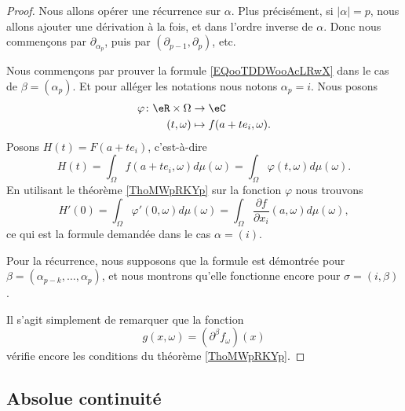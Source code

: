 \begin{proof}
	Nous allons opérer une récurrence sur \( \alpha\). Plus précisément, si \( | \alpha |=p\), nous allons ajouter une dérivation à la fois, et dans l'ordre inverse de \( \alpha\). Donc nous commençons par \( \partial_{\alpha_p}\), puis par \( (\partial_{p-1}, \partial_p)\), etc.

	Nous commençons par prouver la formule \eqref{EQooTDDWooAcLRwX} dans le cas de \( \beta=(\alpha_p)\). Et pour alléger les notations nous notons \( \alpha_p=i\). Nous posons
	\begin{equation}
		\begin{aligned}
			\varphi\colon \eR\times \Omega & \to \eC                   \\
			(t,\omega)                     & \mapsto f(a+te_i,\omega).
		\end{aligned}
	\end{equation}
	Posons \( H(t)=F(a+te_i)\), c'est-à-dire
	\begin{equation}
		H(t)=\int_{\Omega}f(a+te_i,\omega)d\mu(\omega)=\int_{\Omega}\varphi(t,\omega)d\mu(\omega).
	\end{equation}
	En utilisant le théorème \ref{ThoMWpRKYp} sur la fonction \( \varphi\) nous trouvons
	\begin{equation}
		H'(0)=\int_{\Omega}\varphi'(0,\omega)d\mu(\omega)=\int_{\Omega}\frac{ \partial f }{ \partial x_i }(a,\omega)d\mu(\omega),
	\end{equation}
	ce qui est la formule demandée dans le cas \( \alpha=(i)\).

	Pour la récurrence, nous supposons que la formule est démontrée pour \( \beta=(\alpha_{p-k},\ldots, \alpha_p)\), et nous montrons qu'elle fonctionne encore pour \( \sigma=(i, \beta)\).

	Il s'agit simplement de remarquer que la fonction
	\begin{equation}
		g(x,\omega)=(\partial^{\beta}f_{\omega})(x)
	\end{equation}
	vérifie encore les conditions du théorème \ref{ThoMWpRKYp}.
\end{proof}

\subsection{Absolue continuité}

